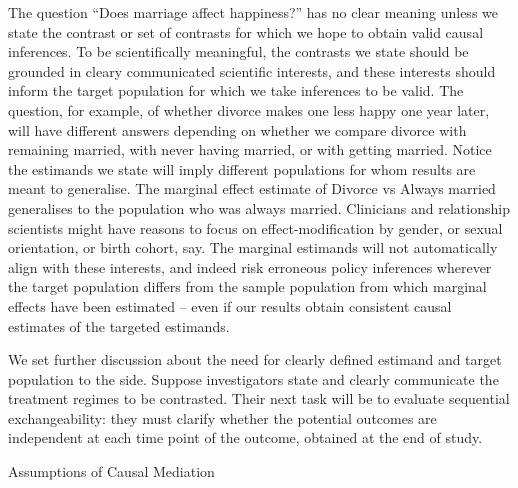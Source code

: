 \documentclass[
  single column]{article}
\begin{document}
The question ``Does marriage affect happiness?'' has no clear meaning
unless we state the contrast or set of contrasts for which we hope to
obtain valid causal inferences. To be scientifically meaningful, the
contrasts we state should be grounded in cleary communicated scientific
interests, and these interests should inform the target population for
which we take inferences to be valid. The question, for example, of
whether divorce makes one less happy one year later, will have different
answers depending on whether we compare divorce with remaining married,
with never having married, or with getting married. Notice the estimands
we state will imply different populations for whom results are meant to
generalise. The marginal effect estimate of Divorce vs Always married
generalises to the population who was always married. Clinicians and
relationship scientists might have reasons to focus on
effect-modification by gender, or sexual orientation, or birth cohort,
say. The marginal estimands will not automatically align with these
interests, and indeed risk erroneous policy inferences wherever the
target population differs from the sample population from which marginal
effects have been estimated -- even if our results obtain consistent
causal estimates of the targeted estimands.

We set further discussion about the need for clearly defined estimand
and target population to the side. Suppose investigators state and
clearly communicate the treatment regimes to be contrasted. Their next
task will be to evaluate sequential exchangeability: they must clarify
whether the potential outcomes are independent at each time point of the
outcome, obtained at the end of study.

\begin{table}

\caption{\label{tbl-swigtabledeveloped}Assumptions of Causal Mediation}

\centering{

\swigtabledeveloped

}

\end{table}%
\end{document}
